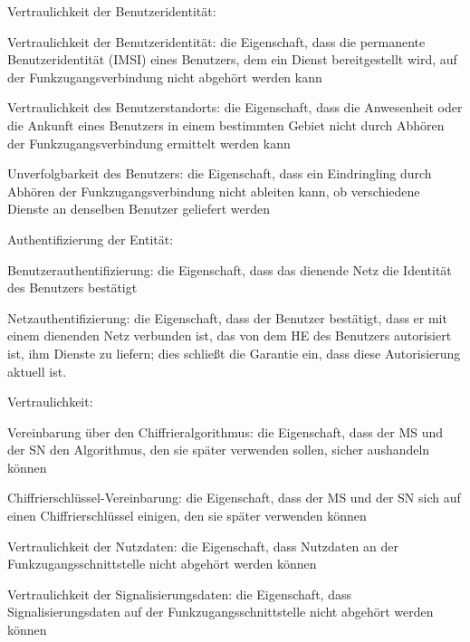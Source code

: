 \documentclass[a4paper]{article}
\begin{document}
\begin{multicols}{3}
      \begin{itemize*}
            \item Vertraulichkeit der Benutzeridentität:
            \begin{itemize*}
                  \item Vertraulichkeit der Benutzeridentität: die Eigenschaft, dass die permanente Benutzeridentität (IMSI) eines Benutzers, dem ein Dienst bereitgestellt wird, auf der Funkzugangsverbindung nicht abgehört werden kann
                  \item Vertraulichkeit des Benutzerstandorts: die Eigenschaft, dass die Anwesenheit oder die Ankunft eines Benutzers in einem bestimmten Gebiet nicht durch Abhören der Funkzugangsverbindung ermittelt werden kann
                  \item Unverfolgbarkeit des Benutzers: die Eigenschaft, dass ein Eindringling durch Abhören der Funkzugangsverbindung nicht ableiten kann, ob verschiedene Dienste an denselben Benutzer geliefert werden
            \end{itemize*}
            \item Authentifizierung der Entität:
            \begin{itemize*}
                  \item Benutzerauthentifizierung: die Eigenschaft, dass das dienende Netz die Identität des Benutzers bestätigt
                  \item Netzauthentifizierung: die Eigenschaft, dass der Benutzer bestätigt, dass er mit einem dienenden Netz verbunden ist, das von dem HE des Benutzers autorisiert ist, ihm Dienste zu liefern; dies schließt die Garantie ein, dass diese Autorisierung aktuell ist.
            \end{itemize*}
            \item Vertraulichkeit:
            \begin{itemize*}
                  \item Vereinbarung über den Chiffrieralgorithmus: die Eigenschaft, dass der MS und der SN den Algorithmus, den sie später verwenden sollen, sicher aushandeln können
                  \item Chiffrierschlüssel-Vereinbarung: die Eigenschaft, dass der MS und der SN sich auf einen Chiffrierschlüssel einigen, den sie später verwenden können
                  \item Vertraulichkeit der Nutzdaten: die Eigenschaft, dass Nutzdaten an der Funkzugangsschnittstelle nicht abgehört werden können
                  \item Vertraulichkeit der Signalisierungsdaten: die Eigenschaft, dass Signalisierungsdaten auf der Funkzugangsschnittstelle nicht abgehört werden können

\end{itemize*}
\end{itemize*}
\end{multicols}
\end{document}
